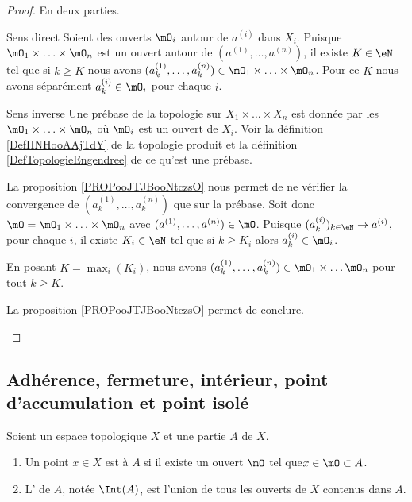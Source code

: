 \begin{proof}
	En deux parties.
	\begin{subproof}
		\item[Sens direct]
		Soient des ouverts \( \mO_i\) autour de \( a^{(i)}\) dans \( X_i\). Puisque \( \mO_1\times \ldots\times \mO_n\) est un ouvert autour de \( (a^{(1)},\ldots, a^{(n)})\), il existe \( K\in \eN\) tel que si \( k\geq K\) nous avons \( (a^{(1)}_k,\ldots, a^{(n)}_k)\in \mO_1\times \ldots \times \mO_n\). Pour ce \( K\) nous avons séparément \( a^{(i)}_k\in \mO_i\) pour chaque \( i\).

		\item[Sens inverse]
		Une prébase de la topologie sur \( X_1\times \ldots\times X_n\) est donnée par les \( \mO_1\times \ldots \times \mO_n\) où \( \mO_i\) est un ouvert de \( X_i\). Voir la définition \ref{DefIINHooAAjTdY} de la topologie produit et la définition \ref{DefTopologieEngendree} de ce qu'est une prébase.

		La proposition \ref{PROPooJTJBooNtczsO} nous permet de ne vérifier la convergence de \( (a^{(1)}_k,\ldots, a^{(n)}_k)\) que sur la prébase. Soit donc \(\mO= \mO_1\times \ldots \times \mO_n\) avec \( (a^{(1)},\ldots, a^{(n)})\in \mO\). Puisque \( (a^{(i)}_k)_{k\in \eN}\to a^{(i)}\), pour chaque \( i\), il existe \( K_i\in \eN\) tel que si \( k\geq K_i\) alors \( a^{(i)}_k\in \mO_i\).

		En posant \( K=\max_i(K_i)\), nous avons \( (a^{(1)}_k,\ldots, a^{(n)}_k)\in \mO_1\times \ldots \mO_n\) pour tout \( k\geq K\).

		La proposition \ref{PROPooJTJBooNtczsO} permet de conclure.
	\end{subproof}
\end{proof}

\subsection{Adhérence, fermeture, intérieur, point d'accumulation et point isolé}

\begin{definition}      \label{DEFooSVWMooLpAVZRInt}
	Soient un espace topologique \( X\) et une partie \( A\) de \( X\).
	\begin{enumerate}
		\item
		      Un point \( x\in X\) est  à \( A\) si il existe un ouvert \( \mO\) tel que\( x\in \mO\subset A\).
		\item
		      L' de \( A\), notée \( \Int(A)\), est l'union de tous les ouverts de \( X\) contenus dans \( A\).
	\end{enumerate}
\end{definition}


